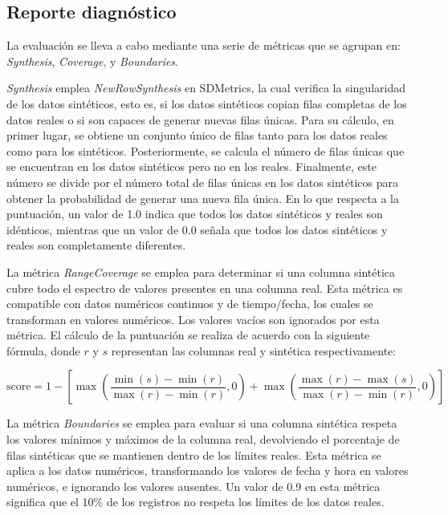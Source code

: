 \subsection{Reporte diagnóstico}
\label{Diagnostic Report}
La evaluación se lleva a cabo mediante una serie de métricas que se agrupan en: \emph{Synthesis}, \emph{Coverage}, y \emph{Boundaries}.

\emph{Synthesis} emplea \emph{NewRowSynthesis} en SDMetrics, la cual verifica la singularidad de los datos sintéticos, esto es, si los datos sintéticos copian filas completas de los datos reales o si son capaces de generar nuevas filas únicas. Para su cálculo, en primer lugar, se obtiene un conjunto único de filas tanto para los datos reales como para los sintéticos. Posteriormente, se calcula el número de filas únicas que se encuentran en los datos sintéticos pero no en los reales. Finalmente, este número se divide por el número total de filas únicas en los datos sintéticos para obtener la probabilidad de generar una nueva fila única. En lo que respecta a la puntuación, un valor de 1.0 indica que todos los datos sintéticos y reales son idénticos, mientras que un valor de 0.0 señala que todos los datos sintéticos y reales son completamente diferentes.

La métrica \emph{RangeCoverage} se emplea para determinar si una columna sintética cubre todo el espectro de valores presentes en una columna real. Esta métrica es compatible con datos numéricos continuos y de tiempo/fecha, los cuales se transforman en valores numéricos. Los valores vacíos son ignorados por esta métrica. El cálculo de la puntuación se realiza de acuerdo con la siguiente fórmula, donde \(r\) y \(s\) representan las columnas real y sintética respectivamente:

\[
\text{{score}} = 1 - \left[ \max\left(\frac{{\min(s) - \min(r)}}{{\max(r) - \min(r)}}, 0\right) + \max\left(\frac{{\max(r) - \max(s)}}{{\max(r) - \min(r)}}, 0\right) \right]
\]

La métrica \emph{Boundaries} se emplea para evaluar si una columna sintética respeta los valores mínimos y máximos de la columna real, devolviendo el porcentaje de filas sintéticas que se mantienen dentro de los límites reales. Esta métrica se aplica a los datos numéricos, transformando los valores de fecha y hora en valores numéricos, e ignorando los valores ausentes. Un valor de 0.9 en esta métrica significa que el 10\% de los registros no respeta los límites de los datos reales.




